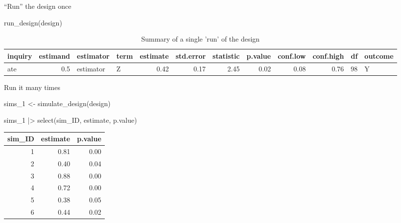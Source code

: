 \documentclass[
  11pt,
  ignorenonframetext,
]{beamer}
\newenvironment{Shaded}{\begin{snugshade}}{\end{snugshade}}
\newcommand{\FunctionTok}[1]{\textcolor[rgb]{0.28,0.35,0.67}{#1}}
\newcommand{\NormalTok}[1]{\textcolor[rgb]{0.00,0.23,0.31}{#1}}
\newcommand{\OtherTok}[1]{\textcolor[rgb]{0.00,0.23,0.31}{#1}}
\newcommand{\SpecialCharTok}[1]{\textcolor[rgb]{0.37,0.37,0.37}{#1}}
\begin{document}
\begin{frame}[fragile]{``Run'' the design once}
\protect\hypertarget{run-the-design-once-1}{}
\begin{Shaded}
\begin{Highlighting}[]
\FunctionTok{run\_design}\NormalTok{(design)}
\end{Highlighting}
\end{Shaded}

\begin{table}

\caption{Summary of a single 'run' of the design}
\centering
\begin{tabular}[t]{l|r|l|l|r|r|r|r|r|r|r|l}
\hline
inquiry & estimand & estimator & term & estimate & std.error & statistic & p.value & conf.low & conf.high & df & outcome\\
\hline
ate & 0.5 & estimator & Z & 0.42 & 0.17 & 2.45 & 0.02 & 0.08 & 0.76 & 98 & Y\\
\hline
\end{tabular}
\end{table}
\end{frame}

\begin{frame}[fragile]{Run it many times}
\protect\hypertarget{run-it-many-times-1}{}
\begin{Shaded}
\begin{Highlighting}[]
\NormalTok{sims\_1 }\OtherTok{\textless{}{-}} \FunctionTok{simulate\_design}\NormalTok{(design) }

\NormalTok{sims\_1 }\SpecialCharTok{|\textgreater{}} \FunctionTok{select}\NormalTok{(sim\_ID, estimate, p.value)}
\end{Highlighting}
\end{Shaded}

\begin{tabular}{r|r|r}
\hline
sim\_ID & estimate & p.value\\
\hline
1 & 0.81 & 0.00\\
\hline
2 & 0.40 & 0.04\\
\hline
3 & 0.88 & 0.00\\
\hline
4 & 0.72 & 0.00\\
\hline
5 & 0.38 & 0.05\\
\hline
6 & 0.44 & 0.02\\
\hline
\end{tabular}
\end{frame}
\end{document}

